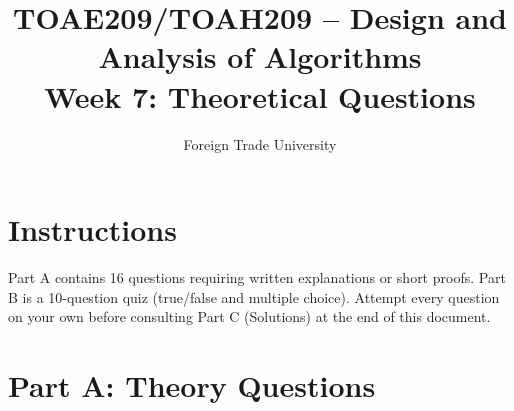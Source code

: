 \documentclass[11pt]{article}
\title{TOAE209/TOAH209 -- Design and Analysis of Algorithms\\[4pt]
\large Week 7: Theoretical Questions}
\author{Foreign Trade University}
\date{}
\begin{document}
\maketitle

\section*{Instructions}

Part A contains 16 questions requiring written explanations or short proofs. Part B is a
10-question quiz (true/false and multiple choice). Attempt every question on your own before
consulting Part C (Solutions) at the end of this document.

\section*{Part A: Theory Questions}
\end{document}
